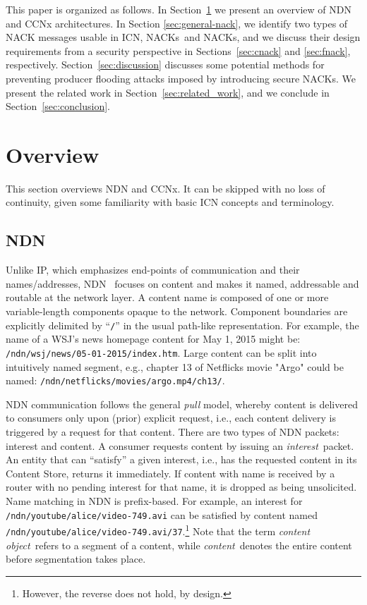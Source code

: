\documentclass[conference]{IEEEtran}
\newcommand{\ndnname}[1]{{\footnotesize\texttt{#1}}}
\newcommand{\content}{{\em content}}
\newcommand{\interest}{{\em interest}}
\newcommand{\contentobject}{{\em content object}}
\newcommand{\cnacks}{\mbox{\sf {\cal c}NACK}s}
\newcommand{\fnacks}{\mbox{\sf {\cal f}NACK}s}
\begin{document}
This paper is organized as follows. In Section~\ref{sec:overview} we present an overview of 
NDN and CCNx architectures. In Section \ref{sec:general-nack}, we identify two types of NACK 
messages usable in ICN, \cnacks\ and \fnacks, and we discuss their design requirements from a security perspective in 
Sections~\ref{sec:cnack} and \ref{sec:fnack}, respectively.
Section~\ref{sec:discussion} discusses some potential methods for preventing producer 
flooding attacks imposed by introducing secure NACKs. We present the related work 
in Section~\ref{sec:related_work}, and we conclude in Section~\ref{sec:conclusion}.


\section{Overview}
\label{sec:overview}
This section overviews NDN and CCNx. It can be skipped with no loss of continuity, given 
some familiarity with basic ICN concepts and terminology. 

\subsection{NDN}
Unlike IP, which emphasizes end-points of communication and their names/addresses,  
NDN~\cite{jacobson2009networking,NDN} focuses on content and makes it named, addressable
and routable at the network layer. A content name is composed of one or more variable-length 
components opaque to the network. Component boundaries are explicitly delimited by 
``\ndnname{/}'' in the usual path-like representation. For example, the name of a WSJ's 
news homepage content for May 1, 2015 
might be: \ndnname{/ndn/wsj/news/05-01-2015/index.htm}. Large content can be split into 
intuitively named segment, e.g., chapter 13 of Netflicks movie "Argo" could be named: 
\ndnname{/ndn/netflicks/movies/argo.mp4/ch13/}. 

NDN communication follows the general {\em pull} model, whereby content is delivered to consumers 
only upon (prior) explicit request, i.e., each content delivery is triggered by a request for that content.
There are two types of NDN packets: interest and content. A consumer 
requests content by issuing an \interest\ packet. An entity that can ``satisfy'' a given interest, 
i.e., has the requested content in its Content Store, returns it immediately.  If content  with name 
 is received by a router with no pending interest for that name, it is dropped as being unsolicited. 
Name matching in NDN is prefix-based. For example, an interest for \ndnname{/ndn/youtube/alice/video-749.avi} 
can be satisfied by content named \ndnname{/ndn/youtube/alice/video-749.avi/37}.\footnote{However, the 
reverse does not hold, by design.}
Note that the term \contentobject\ refers to a segment of a content, while
\content\ denotes the entire content before segmentation takes place.
\end{document}
